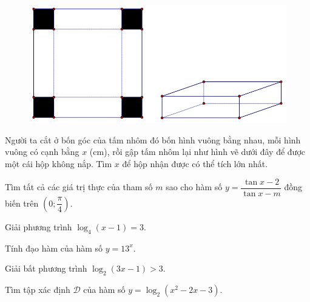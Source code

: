 \begin{vnmultiplechoice}[ rearrange=yes, keycolumns=5]
\begin{question}
\begin{figure}
\includegraphics[scale =0.5]{toan03}
\end{figure}
Người ta cắt ở bốn góc của tấm
nhôm đó bốn hình vuông bằng nhau, mỗi hình vuông có cạnh bằng $x$ (cm), rồi gập tấm
nhôm lại như hình vẽ dưới đây để được một cái hộp không nắp. Tìm $x$ để hộp nhận
được có thể tích lớn nhất.
\datcot
\bonpa
{}
{}
{}
{}
\end{question}

\begin{question}%
Tìm tất cả các giá trị thực của tham số $m$ sao cho hàm số $y=\dfrac{\tan x-2}{\tan x -m}$ đồng biến trên $\left(0;\dfrac{\pi}{4}\right)$.
\datcot[2]
\bonpa
{}
{}
{}
{}
\end{question}

\begin{question}%
Giải phương trình $\log_4(x-1)=3$.
\datcot
\bonpa
{}
{}
{}
{}
\end{question}


\begin{question}%
Tính đạo hàm của hàm số $y=13^x$.
\datcot
\bonpa
{}
{}
{}
{}
\end{question}


\begin{question}%
Giải bất phương trình $\log_2(3x-1)>3$.
\datcot
\bonpa
{}
{}
{}
{}
\end{question}



\begin{question}%
Tìm tập xác định $\mathcal{D}$ của hàm số $y=\log_2(x^2-2x-3)$.
\datcot[2]
\bonpa
{\sai{$\mathcal{D}=(-\infty;-1]\cup [3;+\infty)$.}}
{}
{}
{}
\end{question}



\end{vnmultiplechoice}
